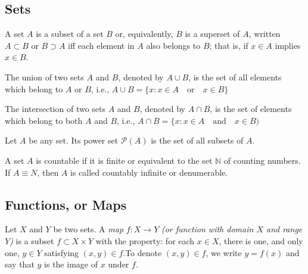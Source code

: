 \documentclass[12pt]{article} %
\begin{document}
\subsection{Sets}
\begin{definition}[Subset]\parencite{lipschutz1965} A set $A$ is a subset of a set $B$ or, equivalently, $B$ is a superset of $A$, written $A\subset B$ or $B\supset A$ iff each element in $A$ also belongs to $B$; that is, if $x\in A$ implies $x\in B$.
\end{definition}

\begin{definition}[Union]\parencite{lipschutz1965}
The union of two sets $A$ and $B$, denoted by $A\cup B$, is the set of all elements which belong to $A$ or $B$, i.e., $A\cup B = \{x:x\in A \quad \text{or} \quad x\in B\}$     
\end{definition}

\begin{definition}[Intersection]\parencite{lipschutz1965}
The intersection of two sets $A$ and $B$, denoted by $A\cap B$, is the set of elements which belong to both $A$ and $B$, i.e., $A\cap B=\{x:x\in A \quad \text{and} \quad x\in B)$   
\end{definition}


\begin{definition}\parencite{Dugundji1966}
Let $A$ be any set. Its power set $\mathcal{P}(A)$ is the set of all subsets of $A$.
\end{definition}

\begin{definition}[Countable]\parencite{Dugundji1966}
 A set $A$ is countable if it is finite or equivalent to the set $\mathbb{N}$ of counting
 numbers. If $A\equiv N$, then $A$ is called countably infinite or denumerable.
\end{definition}


\subsection{Functions, or Maps}

\begin{definition}[Map] \parencite{Dugundji1966}
Let $X$ and $Y$ be two sets. A \textit{map} $f: X \rightarrow Y$ \textit{(or function with domain $X$ and range $Y$)} is a subset $f\subset X \times Y$ with the property: for each $x\in X$, there is one, and only one, $y\in Y$ satisfying $(x,y)\in f$.To denote $(x,y)\in f$, we write $y=f(x)$ and say that $y$ is the image of $x$ under $f$.
\end{definition}
\end{document}
